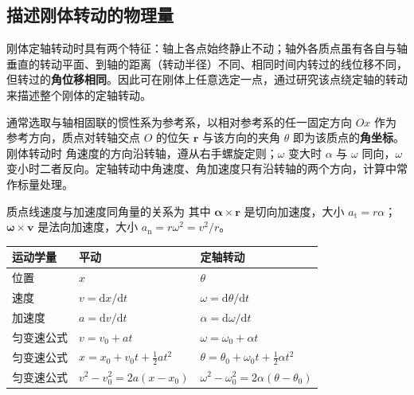     \subsection{描述刚体转动的物理量}
    刚体定轴转动时具有两个特征：轴上各点始终静止不动；轴外各质点虽有各自与轴垂直的转动平面、到轴的距离（转动半径）不同、相同时间内转过的线位移不同，但转过的\textbf{角位移相同}。因此可在刚体上任意选定一点，通过研究该点绕定轴的转动来描述整个刚体的定轴转动。

    通常选取与轴相固联的惯性系为参考系，以相对参考系的任一固定方向 $Ox$ 作为参考方向，质点对转轴交点 $O$ 的位矢 $\boldsymbol{r}$ 与该方向的夹角 $\theta$ 即为该质点的\textbf{角坐标}。刚体转动时
    角速度的方向沿转轴，遵从右手螺旋定则；$\omega$ 变大时 $\alpha$ 与 $\omega$ 同向，$\omega$ 变小时二者反向。定轴转动中角速度、角加速度只有沿转轴的两个方向，计算中常作标量处理。

    质点线速度与加速度同角量的关系为
    其中 $\boldsymbol{\alpha}\times\boldsymbol{r}$ 是切向加速度，大小 $a_{\mathrm{t}}=r\alpha$；$\boldsymbol{\omega}\times\boldsymbol{v}$ 是法向加速度，大小 $a_{\mathrm{n}}=r\omega^{2}=v^{2}/r$。

    \begin{center}
    \begin{tabular}{lll}
    \toprule
    运动学量 & 平动 & 定轴转动 \\
    \midrule
    位置 & $x$ & $\theta$ \\
    速度 & $v=\mathrm{d}x/\mathrm{d}t$ & $\omega=\mathrm{d}\theta/\mathrm{d}t$ \\
    加速度 & $a=\mathrm{d}v/\mathrm{d}t$ & $\alpha=\mathrm{d}\omega/\mathrm{d}t$ \\
    匀变速公式 & $v=v_{0}+at$ & $\omega=\omega_{0}+\alpha t$ \\
    匀变速公式 & $x=x_{0}+v_{0}t+\frac{1}{2}at^{2}$ & $\theta=\theta_{0}+\omega_{0}t+\frac{1}{2}\alpha t^{2}$ \\
    匀变速公式 & $v^{2}-v_{0}^{2}=2a(x-x_{0})$ & $\omega^{2}-\omega_{0}^{2}=2\alpha(\theta-\theta_{0})$ \\
    \bottomrule
    \end{tabular}
    \end{center}

